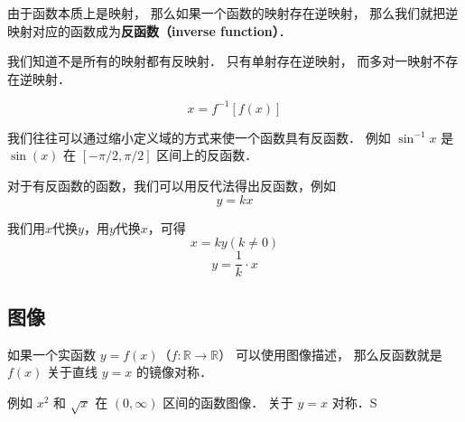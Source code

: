 
\begin{issues}
\issueDraft
\end{issues}

由于函数本质上是映射， 那么如果一个函数的映射存在逆映射， 那么我们就把逆映射对应的函数成为\textbf{反函数（inverse function）}．

我们知道不是所有的映射都有反映射． 只有单射存在逆映射， 而多对一映射不存在逆映射．

\begin{equation}
x = f^{-1}[f(x)]
\end{equation}

我们往往可以通过缩小定义域的方式来使一个函数具有反函数． 例如 $\sin^{-1} x$ 是 $\sin(x)$ 在 $[-\pi/2, \pi/2]$ 区间上的反函数．

对于有反函数的函数，我们可以用反代法得出反函数，例如
\begin{equation}
y = kx
\end{equation}

我们用$x$代换$y$，用$y$代换$x$，可得
\begin{equation}
x = ky (k \ne 0)
\end{equation}
\begin{equation}
y = \frac{1}{k} \cdot x
\end{equation}

\subsection{图像}
如果一个实函数 $y = f(x)$（$f: \mathbb R \to \mathbb R$） 可以使用图像描述， 那么反函数就是 $f(x)$ 关于直线 $y = x$ 的镜像对称．

例如 $x^2$ 和 $\sqrt{x}$ 在 $(0, \infty)$ 区间的函数图像． 关于 $y = x$ 对称．S